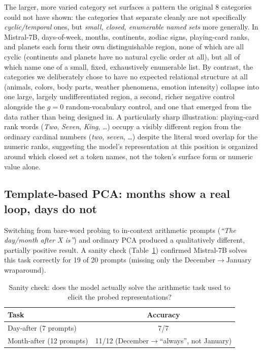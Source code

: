 \documentclass[11pt]{article}
\begin{document}
The larger, more varied category set surfaces a pattern the original 8
categories could not have shown: the categories that separate cleanly are
not specifically \emph{cyclic/temporal} ones, but \emph{small, closed,
enumerable named sets} more generally. In Mistral-7B, days-of-week, months,
continents, zodiac signs, playing-card ranks, and planets each form their
own distinguishable region, none of which are all cyclic (continents and
planets have no natural cyclic order at all), but all of which name one of a
small, fixed, exhaustively enumerable list. By contrast, the categories we
deliberately chose to have no expected relational structure at all (animals,
colors, body parts, weather phenomena, emotion intensity) collapse into one
large, largely undifferentiated region, a second, richer negative control
alongside the $g{=}0$ random-vocabulary control, and one that emerged from
the data rather than being designed in. A particularly sharp illustration:
playing-card rank words (\emph{Two}, \emph{Seven}, \emph{King}, \ldots)
occupy a visibly different region from the ordinary cardinal numbers
(\emph{two}, \emph{seven}, \ldots) despite the literal word overlap for the
numeric ranks, suggesting the model's representation at this position is
organized around which closed set a token names, not the token's surface
form or numeric value alone.

\subsection{Template-based PCA: months show a real loop, days do not}

Switching from bare-word probing to in-context arithmetic prompts (\emph{``The
day/month after X is''}) and ordinary PCA produced a qualitatively different,
partially positive result. A sanity check (Table~\ref{tab:tasksanity})
confirmed Mistral-7B solves this task correctly for 19 of 20 prompts (missing
only the December$\to$January wraparound).

\label{sec:tasksanity}
\begin{table}[H]
  \centering
  \begin{tabular}{lc}
    \toprule
    Task & Accuracy \\
    \midrule
    Day-after (7 prompts)   & 7/7 \\
    Month-after (12 prompts) & 11/12 (December$\to$``always'', not January) \\
    \bottomrule
  \end{tabular}
  \caption{Sanity check: does the model actually solve the arithmetic task
  used to elicit the probed representations?}
  \label{tab:tasksanity}
\end{table}
\end{document}
